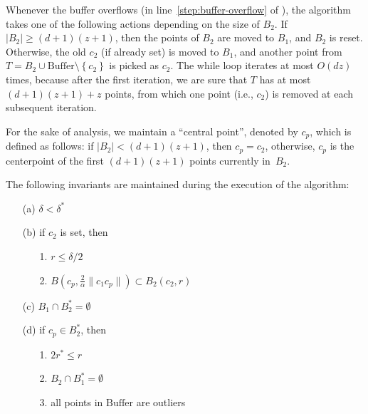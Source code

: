 \documentclass[envcountsame]{cls/cccg15}
\newcommand{\cp}{c_p}
\newcommand{\dz}{(d + 1)(z + 1)}
\newcommand{\Buffer}{\ensuremath{\text{Buffer}}}
\newcommand{\set}[1]{\left\{ #1 \right\}}
\newcommand{\card}[1]{\left|{#1}\right|}
\newcommand{\len}[1]{\|{#1}\|}
\newcommand{\radius}[1]{\frac{2}{\alpha} \len{c_1 #1}}
\newcommand{\lee}{\leqslant}
\newcommand{\gee}{\geqslant}
\renewcommand{\leq}{\lee}
\renewcommand{\le}{\lee}
\renewcommand{\ge}{\gee}
\begin{document}
Whenever the buffer overflows (in line~\ref{step:buffer-overflow} of ),
the algorithm takes one of the following actions
depending on the size of $B_2$. 
If $|B_2| \ge \dz$, then the points of $B_2$ are moved to $B_1$, and $B_2$ is reset.
Otherwise, the old $c_2$ (if already set) is moved to $B_1$,
and another point from $T = B_2 \cup \Buffer \setminus \set{c_2}$ is picked as $c_2$.
The while loop iterates at most $O(dz)$ times,
because after the first iteration, we are sure 
that $T$ has at most $\dz + z$ points, from which 
one point (i.e., $c_2$) is removed at each subsequent iteration.


For the sake of analysis, we maintain a ``central point'', 
denoted by $\cp$, %
which is defined as follows:
if $\card{B_2} < \dz$, then $\cp = c_2$, otherwise,
$\cp$ is the centerpoint of the first $\dz$ points currently in~$B_2$.

\begin{lemma}
\label{lem:invariants}
	The following invariants are maintained during the execution of the algorithm:

\begin{enumerate}
\item [(a)] $\delta < \delta^*$ %
\item [(b)] if $c_2$ is set, then
\begin{enumerate}
	\item[1.] $r \leq \delta/2$
	\item[2.] $B(c_p, \radius{c_p}) \subset B_2(c_2, r)$
\end{enumerate}
\item [(c)] $B_1 \cap B_2^* = \emptyset$
\item [(d)]  if $\cp \in B_2^*$, then 
	\begin{enumerate}
		\item [1.] $2r^* \le r$
		\item [2.] $B_2 \cap B_1^* = \emptyset$
		\item [3.] all points in $\Buffer$ are outliers
	\end{enumerate}

\end{enumerate}
\end{lemma}
\end{document}
